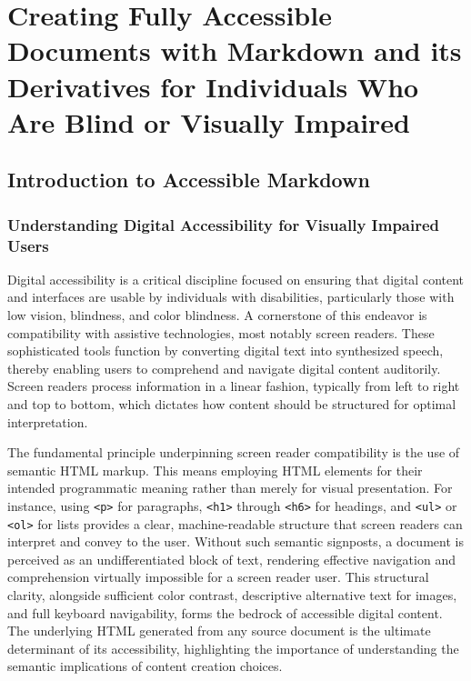 \chapter{Creating Fully Accessible Documents with Markdown and its Derivatives for Individuals Who Are Blind or Visually Impaired}
\label{chap:accessible-markdown}

\section{Introduction to Accessible Markdown}
\label{sec:intro-accessible-markdown}

\subsection{Understanding Digital Accessibility for Visually Impaired Users}
Digital accessibility is a critical discipline focused on ensuring that digital content and interfaces are usable by individuals with disabilities, particularly those with low vision, blindness, and color blindness.\cite{ReciteMe,TextToBraille} A cornerstone of this endeavor is compatibility with assistive technologies, most notably screen readers.\cite{ReciteMe,TestDevLab} These sophisticated tools function by converting digital text into synthesized speech, thereby enabling users to comprehend and navigate digital content auditorily.\cite{ReciteMe,TestDevLab} Screen readers process information in a linear fashion, typically from left to right and top to bottom, which dictates how content should be structured for optimal interpretation.\cite{DSU,SmashingMagazine}

The fundamental principle underpinning screen reader compatibility is the use of semantic HTML markup. This means employing HTML elements for their intended programmatic meaning rather than merely for visual presentation.\cite{MDNHTML,UniversalDesign} For instance, using \texttt{<p>} for paragraphs, \texttt{<h1>} through \texttt{<h6>} for headings, and \texttt{<ul>} or \texttt{<ol>} for lists provides a clear, machine-readable structure that screen readers can interpret and convey to the user. Without such semantic signposts, a document is perceived as an undifferentiated block of text, rendering effective navigation and comprehension virtually impossible for a screen reader user.\cite{MDNHTML,UniversalDesign} This structural clarity, alongside sufficient color contrast, descriptive alternative text for images, and full keyboard navigability, forms the bedrock of accessible digital content.\cite{ReciteMe,TestDevLab,MDNHTML} The underlying HTML generated from any source document is the ultimate determinant of its accessibility, highlighting the importance of understanding the semantic implications of content creation choices.


